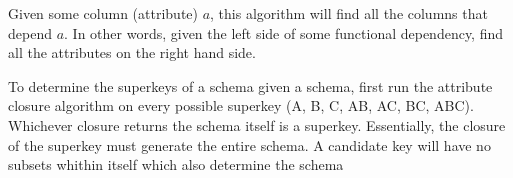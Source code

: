 \documentclass{article}
\begin{document}
Given some column (attribute) $a$, this algorithm will find all the columns that depend $a$. In other words, given the left side of some functional dependency, find all the attributes on the right hand side. 

\begin{remark}
  To determine the superkeys of a schema given a schema, first run the attribute closure algorithm on every possible superkey (A, B, C, AB, AC, BC, ABC). Whichever closure returns the schema itself is a superkey. Essentially, the closure of the superkey must generate the entire schema. A candidate key will have no subsets whithin itself which also determine the schema
\end{remark}
\end{document}
